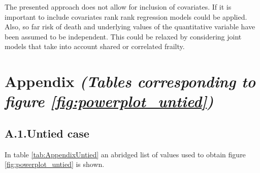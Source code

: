 \documentclass[bimj,fleqn]{w-art}\usepackage[]{graphicx}\usepackage[]{color}
\theoremstyle{plain}
\theoremstyle{definition}
\begin{document}
The presented approach does not allow for inclusion of covariates. If it is
important to include covariates rank rank regression models could be applied.
Also, so far risk of death and underlying values of the quantitative variable
have been assumed to be independent. This could be relaxed by considering joint
models that take into account shared or correlated frailty.

\section*{Appendix {\it(Tables corresponding to figure \ref{fig:powerplot_untied})}}
\subsection*{A.1.\enspace Untied case}
In table \ref{tab:AppendixUntied} an abridged list of values used to obtain
figure \ref{fig:powerplot_untied} is shown.
\end{document}
